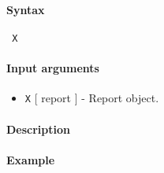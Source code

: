 


	\paragraph{Syntax}
 
 \begin{verbatim}
 X
 \end{verbatim}
 
 \paragraph{Input arguments}
 
 \begin{itemize}
 \item
   \texttt{X} {[} report {]} - Report object.
 \end{itemize}
 
 \paragraph{Description}
 
 \paragraph{Example}


